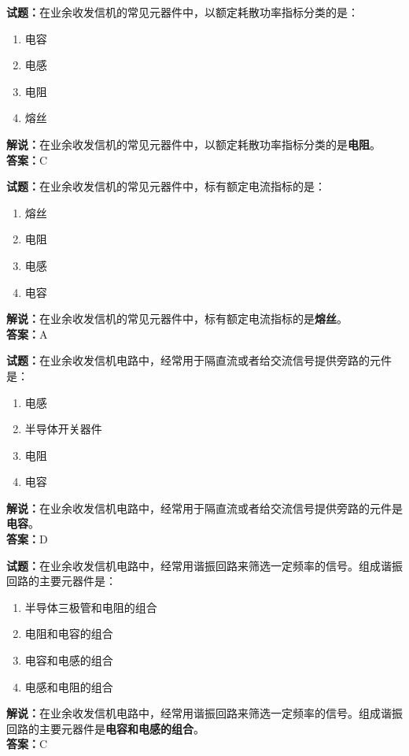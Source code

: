 \documentclass{ctexbook}
\begin{document}
\noindent\textbf{试题：}在业余收发信机的常见元器件中，以额定耗散功率指标分类的是：
\begin{enumerate}[leftmargin=3em]
\item 电容
\item 电感
\item 电阻
\item 熔丝
\end{enumerate}
\noindent\textbf{解说：}在业余收发信机的常见元器件中，以额定耗散功率指标分类的是\textbf{电阻}。\\\noindent\textbf{答案：}C

\bigskip


\noindent\textbf{试题：}在业余收发信机的常见元器件中，标有额定电流指标的是：
\begin{enumerate}[leftmargin=3em]
\item 熔丝
\item 电阻
\item 电感
\item 电容
\end{enumerate}
\noindent\textbf{解说：}在业余收发信机的常见元器件中，标有额定电流指标的是\textbf{熔丝}。\\\noindent\textbf{答案：}A


\bigskip


\noindent\textbf{试题：}在业余收发信机电路中，经常用于隔直流或者给交流信号提供旁路的元件是：
\begin{enumerate}[leftmargin=3em]
\item 电感
\item 半导体开关器件
\item 电阻
\item 电容
\end{enumerate}
\noindent\textbf{解说：}在业余收发信机电路中，经常用于隔直流或者给交流信号提供旁路的元件是\textbf{电容}。\\\noindent\textbf{答案：}D

\bigskip


\noindent\textbf{试题：}在业余收发信机电路中，经常用谐振回路来筛选一定频率的信号。组成谐振回路的主要元器件是：
\begin{enumerate}[leftmargin=3em]
\item 半导体三极管和电阻的组合
\item 电阻和电容的组合
\item 电容和电感的组合
\item 电感和电阻的组合
\end{enumerate}
\noindent\textbf{解说：}在业余收发信机电路中，经常用谐振回路来筛选一定频率的信号。组成谐振回路的主要元器件是\textbf{电容和电感的组合}。\\\noindent\textbf{答案：}C
\end{document}
